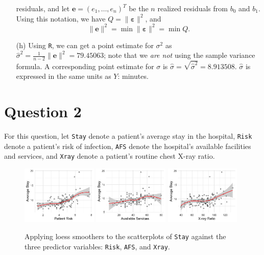 \documentclass[10pt]{article}
\begin{document}
\begin{itemize}
    residuals, and let \(\mathbf{e} = (e_1, \ldots, e_n)^T\) be the \(n\) realized residuals from \(b_0\)
    and \(b_1\). Using this 
    notation, we have \(Q = \| \bm{\varepsilon} \|^2\), and \[\| \mathbf{e}\|^2 = \min \|\bm{\varepsilon}\|^2 = \min Q.\]
    \item[(h)] Using \texttt{R}, we can get a point estimate for \(\sigma^2\) as \(\hat{\sigma}^2 = \frac{1}{n-2} \|\mathbf{e}\|^2 = 79.45063\); note that we 
    \textit{are not} using the sample variance formula. A corresponding point estimate for \(\sigma\) is \(\hat{\sigma} = \sqrt{\hat{\sigma}^2} = 8.913508\). 
    \(\hat{\sigma}\) is expressed in the same units as \(Y\): minutes. 

\end{itemize}

\section{Question 2} \noindent
For this question, let \texttt{Stay} denote a patient's average stay in the hospital, \texttt{Risk} denote a patient's risk of infection, \texttt{AFS} 
denote the hospital's available facilities and services, and \texttt{Xray} denote a patient's routine chest X-ray ratio. 
\begin{figure}[ht]
    \includegraphics[width = 0.32\textwidth]{q02_loess1.png}
    \includegraphics[width = 0.32\textwidth]{q02_loess2.png}
    \includegraphics[width = 0.32\textwidth]{q02_loess3.png}
    \caption{Applying loess smoothers to the scatterplots of \texttt{Stay} against the three predictor variables: \texttt{Risk}, \texttt{AFS}, and 
    \texttt{Xray}.}
    \label{q02_fig01}
\end{figure}
\end{document}
